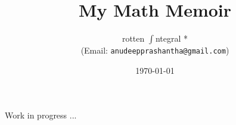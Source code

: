 \documentclass[a4paper, 11pt]{booscr}
\title{\textbf{My Math Memoir}}
\author{rotten $\int$ntegral *\\(Email: \texttt{anudeepprashantha@gmail.com})}
\date{\today}
\begin{document}
\maketitle
    \tableofcontents
	Work in progress ...
\end{document}
